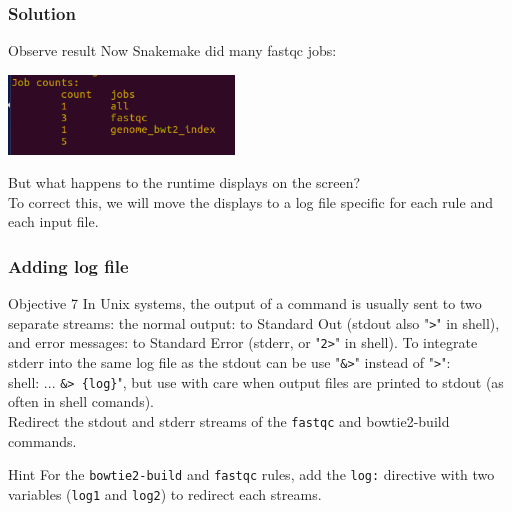 \begin{frame}[containsverbatim]
\frametitle{Solution}

\begin{exampleblock}{Observe result}
Now Snakemake did many fastqc jobs:
\begin{center}
    \includegraphics[width=6cm]{03_workflow/images/FAIR_ex1_o6_smk.png}
\end{center}
But what happens to the runtime displays on the screen?\\

To correct this, we will move the displays to a log file specific for each rule and each input file.
\end{exampleblock}
\end{frame}
\begin{frame}[containsverbatim]
\frametitle{Adding log file}
\begin{exampleblock}{Objective 7}
In Unix systems, the output of a command is usually sent to two separate streams: the normal output: to Standard Out (stdout also "\verb|>|" in shell), and error messages: to Standard Error (stderr, or "\verb|2>|" in shell). To integrate stderr into the same log file as the stdout can be use "\verb|&>|" instead of "\verb|>|": \\ 
shell: ...  \verb|&> {log}|", but use with care when output files are printed to stdout (as often in shell comands).\\
Redirect the stdout and stderr streams of the \verb|fastqc| and bowtie2-build commands. \\
\end{exampleblock}
\begin{exampleblock}{Hint}
For the \verb|bowtie2-build| and \verb|fastqc| rules, add the \verb|log:| directive with two variables (\verb|log1| and \verb|log2|) to redirect each streams.
\end{exampleblock}
\end{frame}
